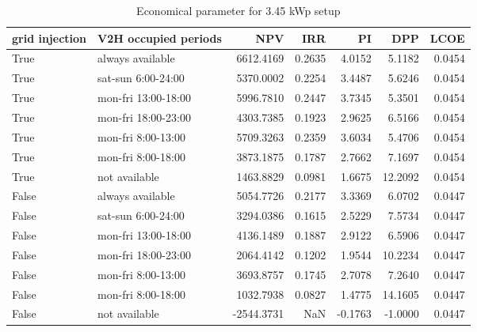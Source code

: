 \begin{table}
\centering
\caption{Economical parameter for 3.45 kWp setup}
\label{tab:results-3.45}
\begin{tabular}{llrrrrr}
\toprule
 grid injection & V2H occupied periods &        NPV &    IRR &      PI &     DPP &   LCOE \\
\midrule
           True &     always available &  6612.4169 & 0.2635 &  4.0152 &  5.1182 & 0.0454 \\
           True &   sat-sun 6:00-24:00 &  5370.0002 & 0.2254 &  3.4487 &  5.6246 & 0.0454 \\
           True &  mon-fri 13:00-18:00 &  5996.7810 & 0.2447 &  3.7345 &  5.3501 & 0.0454 \\
           True &  mon-fri 18:00-23:00 &  4303.7385 & 0.1923 &  2.9625 &  6.5166 & 0.0454 \\
           True &   mon-fri 8:00-13:00 &  5709.3263 & 0.2359 &  3.6034 &  5.4706 & 0.0454 \\
           True &   mon-fri 8:00-18:00 &  3873.1875 & 0.1787 &  2.7662 &  7.1697 & 0.0454 \\
           True &        not available &  1463.8829 & 0.0981 &  1.6675 & 12.2092 & 0.0454 \\
          False &     always available &  5054.7726 & 0.2177 &  3.3369 &  6.0702 & 0.0447 \\
          False &   sat-sun 6:00-24:00 &  3294.0386 & 0.1615 &  2.5229 &  7.5734 & 0.0447 \\
          False &  mon-fri 13:00-18:00 &  4136.1489 & 0.1887 &  2.9122 &  6.5906 & 0.0447 \\
          False &  mon-fri 18:00-23:00 &  2064.4142 & 0.1202 &  1.9544 & 10.2234 & 0.0447 \\
          False &   mon-fri 8:00-13:00 &  3693.8757 & 0.1745 &  2.7078 &  7.2640 & 0.0447 \\
          False &   mon-fri 8:00-18:00 &  1032.7938 & 0.0827 &  1.4775 & 14.1605 & 0.0447 \\
          False &        not available & -2544.3731 &    NaN & -0.1763 & -1.0000 & 0.0447 \\
\bottomrule
\end{tabular}
\end{table}
